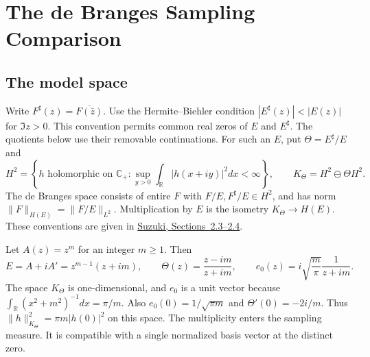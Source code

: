 \chapter{The de Branges Sampling Comparison}
\label{v4-arith:w7-c:chapter}

\section{The model space}

Write $F^\sharp(z)=\overline{F(\bar z)}$.
Use the Hermite--Biehler condition $|E^\sharp(z)|<|E(z)|$ for $\Im z>0$.
This convention permits common real zeros of $E$ and $E^\sharp$.
The quotients below use their removable continuations.
For such an $E$, put $\Theta=E^\sharp/E$ and
\[
 H^2=\left\{h\text{ holomorphic on }\mathbb C_+:
      \sup_{y>0}\int_{\mathbb R}|h(x+iy)|^2dx<\infty\right\},
 \qquad K_\Theta=H^2\ominus\Theta H^2.
\]
The de Branges space consists of entire $F$ with $F/E,F^\sharp/E\in H^2$,
and has norm $\|F\|_{H(E)}=\|F/E\|_{L^2}$.
Multiplication by $E$ is the isometry $K_\Theta\to H(E)$.
These conventions are given in \href{https://arxiv.org/html/2301.00421v3}{Suzuki, Sections~2.3--2.4}.

\begin{example}\label{v4-arith:db:ex:multiple}
Let $A(z)=z^m$ for an integer $m\ge1$. Then
\[
 E=A+iA'=z^{m-1}(z+im),\qquad
 \Theta(z)=\frac{z-im}{z+im},\qquad
 e_0(z)=i\sqrt{\frac m\pi}\frac1{z+im}.
\]
The space $K_\Theta$ is one-dimensional, and $e_0$ is a unit vector because
$\int_{\mathbb R}(x^2+m^2)^{-1}dx=\pi/m$.
Also $e_0(0)=1/\sqrt{\pi m}$ and $\Theta'(0)=-2i/m$.
Thus $\|h\|_{K_\Theta}^2=\pi m|h(0)|^2$ on this space.
The multiplicity enters the sampling measure.
It is compatible with a single normalized basis vector at the distinct zero.
\end{example}

